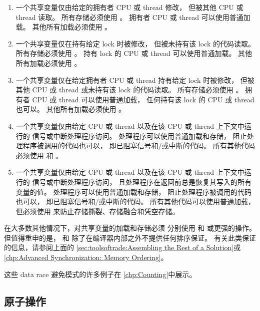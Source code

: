 \begin{enumerate}
\item	一个共享变量仅由给定的拥有者 CPU 或 thread 修改，
	但被其他 CPU 或 thread 读取。
	所有存储必须使用 。
	拥有者 CPU 或 thread 可以使用普通加载。
	其他所有加载必须使用 。
\item	一个共享变量仅在持有给定 lock 时被修改，
	但被未持有该 lock 的代码读取。
	所有存储必须使用 。
	持有 lock 的 CPU 或 thread 可以使用普通加载。
	其他所有加载必须使用 。
\item	一个共享变量仅在给定拥有者 CPU 或 thread
	持有给定 lock 时被修改，
	但被其他 CPU 或 thread 或未持有该 lock 的代码读取。
	所有存储必须使用 。
	拥有者 CPU 或 thread 可以使用普通加载，
	任何持有该 lock 的 CPU 或 thread 也可以。
	其他所有加载必须使用 。
\item	一个共享变量仅由给定 CPU 或 thread
	以及在该 CPU 或 thread 上下文中运行的
	信号或中断处理程序访问。
	处理程序可以使用普通加载和存储，
	阻止处理程序被调用的代码也可以，
	即已阻塞信号和/或中断的代码。
	所有其他代码必须使用  和 。
\item	一个共享变量仅由给定 CPU 或 thread
	以及在该 CPU 或 thread 上下文中运行的
	信号或中断处理程序访问，
	且处理程序在返回前总是恢复其写入的所有变量的值。
	处理程序可以使用普通加载和存储，
	阻止处理程序被调用的代码也可以，
	即已阻塞信号和/或中断的代码。
	所有其他代码可以使用普通加载，但必须使用 
	来防止存储撕裂、存储融合和凭空存储。
\end{enumerate}

\QuickQuizEnd

在大多数其他情况下，对共享变量的加载和存储必须
分别使用  和  或更强的操作。
但值得重申的是， 和 
除了在编译器内部之外不提供任何排序保证。
有关此类保证的信息，请参阅上面的
\cref{sec:toolsoftrade:Assembling the Rest of a Solution}或
\cref{chp:Advanced Synchronization: Memory Ordering}。

这些 data race 避免模式的许多例子在
\cref{chp:Counting}中展示。

\subsection{原子操作}
\label{sec:toolsoftrade:Atomic Operations}

